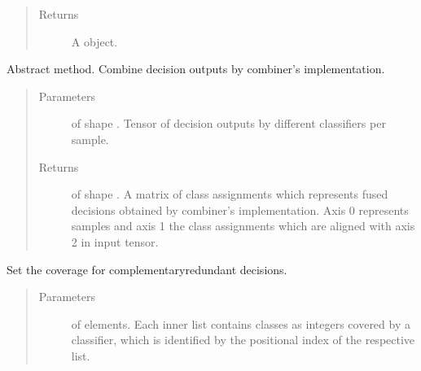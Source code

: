 \documentclass[letterpaper,10pt,english]{sphinxmanual}
\begin{document}
\begin{fulllineitems}
\begin{fulllineitems}
\begin{quote}
\begin{description}
\item[{Returns}] \leavevmode
\sphinxAtStartPar
A  object.

\end{description}\end{quote}

\end{fulllineitems}


\begin{fulllineitems}
\label{\detokenize{pusion.core.combiner:pusion.core.combiner.Combiner.combine}}
\sphinxAtStartPar
Abstract method. Combine decision outputs by combiner’s implementation.
\begin{quote}\begin{description}
\item[{Parameters}] \leavevmode
\sphinxAtStartPar
{} \textendash{}  of shape .
Tensor of decision outputs by different classifiers per sample.

\item[{Returns}] \leavevmode
\sphinxAtStartPar
{} of shape . A matrix of class assignments which represents fused
decisions obtained by combiner’s implementation. Axis 0 represents samples and axis 1 the class
assignments which are aligned with axis 2 in  input tensor.

\end{description}\end{quote}

\end{fulllineitems}


\begin{fulllineitems}
\label{\detokenize{pusion.core.combiner:pusion.core.combiner.Combiner.set_coverage}}
\sphinxAtStartPar
Set the coverage for complementary\sphinxhyphen{}redundant decisions.
\begin{quote}\begin{description}
\item[{Parameters}] \leavevmode
\sphinxAtStartPar
{} \textendash{}  of  elements. Each inner list contains classes as integers covered by a
classifier, which is identified by the positional index of the respective list.


\end{description}
\end{quote}
\end{fulllineitems}
\end{fulllineitems}
\end{document}
